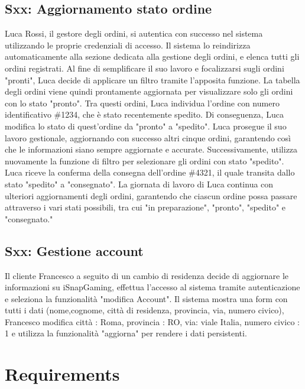 \documentclass[12pt, a4paper, oneside]{book}
\begin{document}
    \subsection*{Sxx: Aggiornamento stato ordine}
        Luca Rossi, il gestore degli ordini, si autentica con successo nel sistema utilizzando le proprie
        credenziali di accesso. Il sistema lo reindirizza automaticamente alla sezione dedicata alla gestione
        degli ordini, e elenca tutti gli ordini registrati.
        Al fine di semplificare il suo lavoro e focalizzarsi sugli ordini "pronti", Luca decide di applicare
        un filtro tramite l'apposita funzione. La tabella degli ordini viene quindi prontamente aggiornata per
        visualizzare solo gli ordini con lo stato "pronto". Tra questi ordini, Luca individua l'ordine con numero
        identificativo \#1234, che è stato recentemente spedito. Di conseguenza, Luca modifica lo stato di
        quest'ordine da "pronto" a "spedito". Luca prosegue il suo lavoro gestionale, aggiornando con successo
        altri cinque ordini, garantendo così che le informazioni siano sempre aggiornate e accurate.
        Successivamente, utilizza nuovamente la funzione di filtro per selezionare gli ordini con stato "spedito".
        Luca riceve la conferma della consegna dell'ordine \#4321, il quale transita dallo stato "spedito" a
        "consegnato". La giornata di lavoro di Luca continua con ulteriori aggiornamenti degli ordini,
        garantendo che ciascun ordine possa passare attraverso i vari stati possibili, tra cui "in preparazione",
        "pronto", "spedito" e "consegnato."

    \subsection*{Sxx: Gestione account}
        Il cliente Francesco a seguito di un cambio di residenza decide di aggiornare le informazioni su
        iSnapGaming, effettua l'accesso al sistema tramite autenticazione e  seleziona la funzionalità
        "modifica Account". Il sistema mostra una form con tutti i dati (nome,cognome, città di residenza,
        provincia, via, numero civico), Francesco modifica città : Roma, provincia : RO, via: viale Italia,
        numero civico : 1 e utilizza la funzionalità "aggiorna" per rendere i dati persistenti.

\section*{Requirements}
\end{document}
